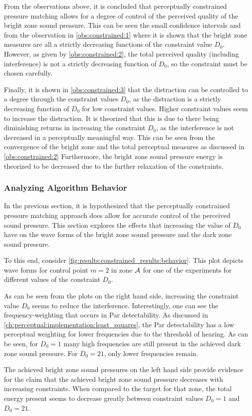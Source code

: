 From the observations above, it is concluded that perceptually constrained pressure matching allows
for a degree of control of the perceived quality of the bright zone sound pressure.
This can be seen the small confidence intervals and 
from the observation in \autoref{obs:constrained:1} where it is shown that the bright zone measures are 
all a strictly decreasing functions of the constraint value $D_0$. 
However, as given by \autoref{obs:constrained:2}, the total perceived quality (including interference) is 
not a strictly decreasing function of $D_0$, so the constraint must be chosen carefully.

Finally, it is shown in \autoref{obs:constrained:3} that the distraction can be controlled to a degree through 
the constraint values $D_0$, as the distraction is a strictly decreasing function of $D_0$ for low constraint values. 
Higher constraint values seem to increase the distraction.
It is theorized that this is due to there being diminishing returns in increasing the constraint $D_0$, as the 
interference is not decreased in a perceptually meaningful way.
This can be seen from the convergence of the bright zone and the total perceptual measures as discussed in 
\autoref{obs:constrained:2}
Furthermore, the bright zone sound pressure energy is theorized to be decreased due to the further 
relaxation of the constraints.

\subsubsection*{Analyzing Algorithm Behavior}

In the previous section, it is hypothesized that the perceptually constrained pressure matching approach does 
allow for accurate control of the perceived sound pressure.
This section explores the effects that increasing the value of $D_0$ have on the wave forms of the 
bright zone sound pressure and the dark zone sound pressure.

To this end, consider \autoref{fig:results:constrained_results:behavior}.
This plot depicts wave forms for control point $m=2$ in zone $\mathcal{A}$ for one of the experiments for different values 
of the constraint $D_0$.

As can be seen from the plots on the right hand side,
increasing the constraint value $D_0$ seems to reduce the interference.
Interestingly, one can see the frequency-weighting that occurs in Par detectability.
As discussed in \autoref{ch:perceptual:implementation:least_squares}, the Par detectability has a low perceptual weighting 
for lower frequencies due to the threshold of hearing.
As can be seen, for $D_0 = 1$ many high frequencies are still present in the achieved dark zone sound pressure.
For $D_0=21$, only lower frequencies remain. 

The achieved bright zone sound pressures on the left hand side provide evidence for the claim that the 
achieved bright zone sound pressure decreases with increasing constraints.
When compared to the target for that zone, the total energy present seems to decrease greatly between 
constraint values $D_0=1$ and $D_0=21$.  
